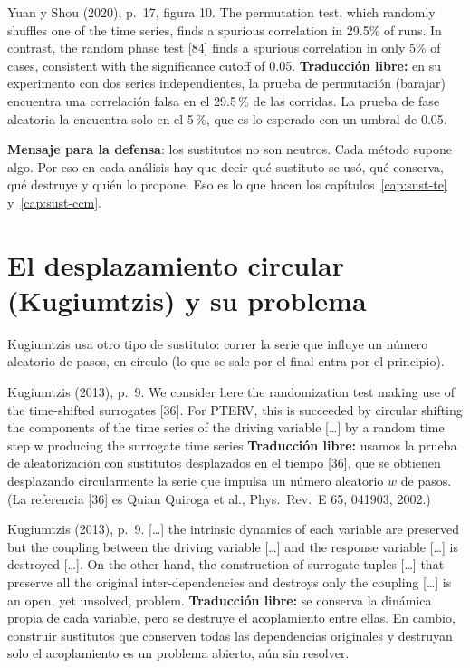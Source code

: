 \documentclass[11pt,openany]{book}
\begin{document}
\begin{cita}{Yuan y Shou (2020), p.~17, figura 10.}
The permutation test, which randomly shuffles one of the time series, finds a spurious correlation in 29.5\% of runs. In contrast, the random phase test [84] finds a spurious correlation in only 5\% of cases, consistent with the significance cutoff of 0.05.
\tcblower
\textbf{Traducción libre:} en su experimento con dos series independientes, la prueba de permutación (barajar) encuentra una correlación falsa en el 29.5\,\% de las corridas. La prueba de fase aleatoria la encuentra solo en el 5\,\%, que es lo esperado con un umbral de 0.05.
\end{cita}

\textbf{Mensaje para la defensa}: los sustitutos no son neutros. Cada método supone algo. Por eso en cada análisis hay que decir qué sustituto se usó, qué conserva, qué destruye y quién lo propone. Eso es lo que hacen los capítulos~\ref{cap:sust-te} y~\ref{cap:sust-ccm}.

\section{El desplazamiento circular (Kugiumtzis) y su problema}

Kugiumtzis usa otro tipo de sustituto: correr la serie que influye un número aleatorio de pasos, en círculo (lo que se sale por el final entra por el principio).

\begin{cita}{Kugiumtzis (2013), p.~9.}
We consider here the randomization test making use of the time-shifted surrogates [36]. For PTERV, this is succeeded by circular shifting the components of the time series of the driving variable [\dots] by a random time step w producing the surrogate time series
\tcblower
\textbf{Traducción libre:} usamos la prueba de aleatorización con sustitutos desplazados en el tiempo [36], que se obtienen desplazando circularmente la serie que impulsa un número aleatorio $w$ de pasos. (La referencia [36] es Quian Quiroga et al., Phys.\ Rev.\ E 65, 041903, 2002.)
\end{cita}

\begin{cita}{Kugiumtzis (2013), p.~9.}
[\dots] the intrinsic dynamics of each variable are preserved but the coupling between the driving variable [\dots] and the response variable [\dots] is destroyed [\dots]. On the other hand, the construction of surrogate tuples [\dots] that preserve all the original inter-dependencies and destroys only the coupling [\dots] is an open, yet unsolved, problem.
\tcblower
\textbf{Traducción libre:} se conserva la dinámica propia de cada variable, pero se destruye el acoplamiento entre ellas. En cambio, construir sustitutos que conserven todas las dependencias originales y destruyan solo el acoplamiento es un problema abierto, aún sin resolver.
\end{cita}
\end{document}

